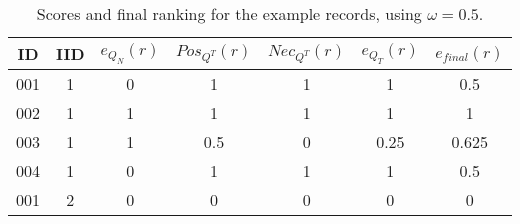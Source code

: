 \vspace{-15pt}
\begin{table}
\caption{Scores and final ranking for the example records, using $\omega = 0.5$.}
\centering
\begin{tabular}{c c c c c c c}
\hline

\textbf{ID} & \textbf{IID} & \textbf{$e_{Q_{N}}(r)$} & \textbf{$Pos_{Q^{T}}(r)$} & \textbf{$Nec_{Q^{T}}(r)$} & \textbf{$e_{Q_{T}}(r)$} & \textbf{$e_{final}(r)$} \\
\hline
001 & 1 & 0 & 1 & 1 & 1 & 0.5 \\
002 & 1 & 1 & 1 & 1 & 1 & 1 \\
003 & 1 & 1 & 0.5 & 0 & 0.25 & 0.625 \\
004 & 1 & 0 & 1 & 1 & 1 & 0.5 \\
001 & 2 & 0 & 0 & 0 & 0 & 0 \\

\hline
\end{tabular}
\label{table:final}
\end{table}
\vspace{-25pt}






